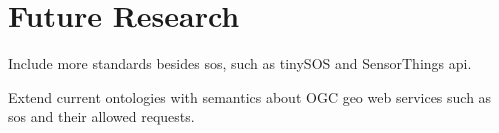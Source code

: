 
\chapter{Future Research}
\label{chap:futureResearch}

Include more standards besides \ac{sos}, such as tinySOS and SensorThings \ac{api}.

Extend current ontologies with semantics about OGC geo web services such as \ac{sos} and their allowed requests.
